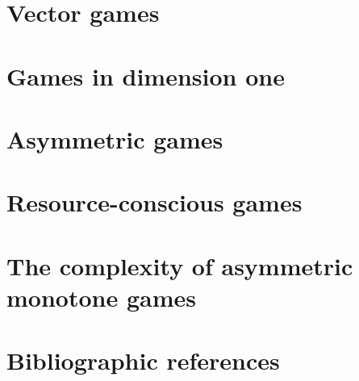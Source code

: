 \section{Vector games}
\label{11-sec:counters}


\section{Games in dimension one}
\label{11-sec:dim1}


\section{Asymmetric games}
\label{11-sec:avag}


\section{Resource-conscious games}
\label{11-sec:resource}


\section{The complexity of asymmetric monotone games}
\label{11-sec:complexity}


\section*{Bibliographic references}
\label{11-sec:references}



